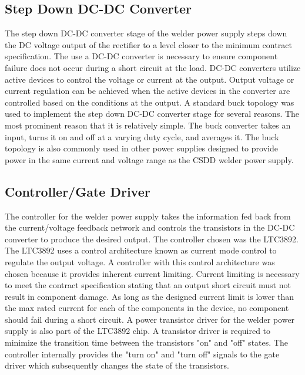 \documentclass[11pt]{article}
\begin{document}
    \subsection{Step Down DC-DC Converter}
        The step down DC-DC converter stage of the welder power supply steps down the DC voltage output of the rectifier to a level closer to the minimum contract specification. The use a DC-DC converter is necessary to ensure component failure does not occur during a short circuit at the load. DC-DC converters utilize active devices to control the voltage or current at the output. Output voltage or current regulation can be achieved when the active devices in the converter are controlled based on the conditions at the output. A standard buck topology was used to implement the step down DC-DC converter stage for several reasons. The most prominent reason that it is relatively simple. The buck converter takes an input, turns it on and off at a varying duty cycle, and averages it. The buck topology is also commonly used in other power supplies designed to provide power in the same current and voltage range as the CSDD welder power supply. 
        
    \subsection{Controller/Gate Driver}
        The controller for the welder power supply takes the information fed back from the current/voltage feedback network and controls the transistors in the DC-DC converter to produce the desired output. The controller chosen was the LTC3892. The LTC3892 uses a control architecture known as current mode control to regulate the output voltage. A controller with this control architecture was chosen because it provides inherent current limiting. Current limiting is necessary to meet the contract specification stating that an output short circuit must not result in component damage. As long as the designed current limit is lower than the max rated current for each of the components in the device, no component should fail during a short circuit. A power transistor driver for the welder power supply is also part of the LTC3892 chip. A transistor driver is required to minimize the transition time between the transistors "on" and "off" states. The controller internally provides the "turn on" and "turn off" signals to the gate driver which subsequently changes the state of the transistors.
        
\end{document}
